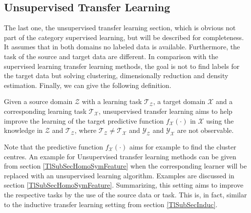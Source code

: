 \subsection{Unsupervised Transfer Learning}\label{TlSubSecUnsuper}
The last one, the unsupervised transfer learning section, which is obvious not part of the category supervised learning, but will be described for completeness.
It assumes that in both domains no labeled data is available.
Furthermore, the task of the source and target data are different.
In comparison with the supervised learning transfer learning methods, the goal is not to find labels for the target data but solving clustering, dimensionally reduction and density estimation.\cite{Pan.2010}
Finally, we can give the following definition.
\begin{mDef}\label{DefUTL}
	 Given a source domain $\mathcal{Z}$ with a learning task $\mathcal{T_Z}$, a target domain $\mathcal{X}$ and a corresponding learning task $\mathcal{T_X}$, unsupervised transfer learning aims to help improve the learning of the target predictive function $f_\mathcal{X}(\cdot)$ in $\mathcal{X}$ using the knowledge in $\mathcal{Z}$ and $\mathcal{T_Z}$, where $\mathcal{T_Z} \neq \mathcal{T_X}$ and $\mathcal{Y_Z}$ and $\mathcal{Y_X}$ are not observable.
\end{mDef}
Note that the predictive function $f_\mathcal{X}(\cdot)$ aims for example to find the cluster centres.
An example for Unsupervised transfer learning methods can be given from section \ref{TlSubSecHomoSymFeature} when the corresponding learner will be replaced with an unsupervised learning algorithm.
Examples are discussed in section \ref{TlSubSecHomoSymFeature}.
Summarizing, this setting aims to improve the respective tasks by the use of the source data or task.
This is, in fact, similar to the inductive transfer learning setting from section \ref{TlSubSecInduc}.\cite{Pan.2010}

